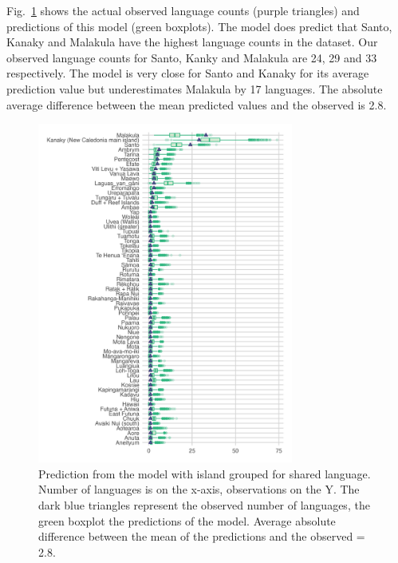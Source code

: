 \documentclass[12pt,letterpaper]{article}
\begin{document}
Fig.~\ref{medium_model_predict} shows the actual observed language counts (purple triangles) and predictions of this model (green boxplots). The model does predict that Santo, Kanaky and Malakula have the highest language counts in the dataset. Our observed language counts for Santo, Kanky and Malakula are 24, 29 and 33 respectively. The model is very close for Santo and Kanaky for its average prediction value but underestimates Malakula by 17 languages. The absolute average difference between the mean predicted values and the observed is 2.8.


\begin{figure}[ht]
\centering
\includegraphics[width=0.75\textwidth]{brms_predict_medium.png}
\caption{Prediction from the model with island grouped for shared language. Number of languages is on the x-axis, observations on the Y. The dark blue triangles represent the observed number of languages, the green boxplot the predictions of the model. Average absolute difference between the mean of the predictions and the observed = 2.8.}
\label{medium_model_predict}
\end{figure}
\end{document}
